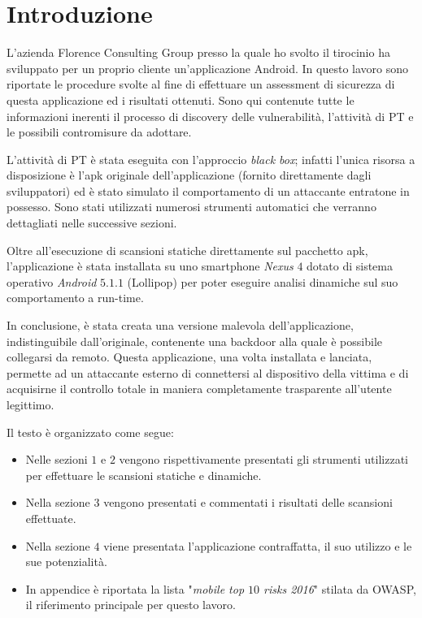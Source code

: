 \chapter*{Introduzione}
L'azienda Florence Consulting Group presso la quale ho svolto il tirocinio ha sviluppato per un proprio cliente un'applicazione Android. In questo lavoro sono riportate le procedure svolte al fine di effettuare un assessment di sicurezza di questa applicazione ed i risultati ottenuti. Sono qui contenute tutte le informazioni inerenti il processo di discovery delle vulnerabilità, l'attività di \ac{PT} e le possibili contromisure da adottare.  

L'attività di PT è stata eseguita con l'approccio \emph{black box}; infatti l'unica risorsa a disposizione è l'apk originale dell'applicazione (fornito direttamente dagli sviluppatori) ed è stato simulato il comportamento di un attaccante entratone in possesso. Sono stati utilizzati numerosi strumenti automatici che verranno dettagliati nelle successive sezioni.

Oltre all'esecuzione di scansioni statiche direttamente sul pacchetto apk, l'applicazione è stata installata su uno smartphone \emph{Nexus} $4$ dotato di sistema operativo \emph{Android} $5.1.1$ (Lollipop) per poter eseguire analisi dinamiche sul suo comportamento a run-time.

In conclusione, è stata creata una versione malevola dell'applicazione, indistinguibile dall'originale, contenente una backdoor alla quale è possibile collegarsi da remoto. Questa applicazione, una volta installata e lanciata, permette ad un attaccante esterno di connettersi al dispositivo della vittima e di acquisirne il controllo totale in maniera completamente trasparente all'utente legittimo.

Il testo è organizzato come segue:

\begin{itemize}
	\item Nelle sezioni $1$ e $2$ vengono rispettivamente presentati gli strumenti utilizzati per effettuare le scansioni statiche e dinamiche.
	\item Nella sezione $3$ vengono presentati e commentati i risultati delle scansioni effettuate.
	\item Nella sezione $4$ viene presentata l'applicazione contraffatta, il suo utilizzo e le sue potenzialità.
	\item In appendice è riportata la lista "\emph{mobile top $10$ risks 2016}" stilata da \ac{OWASP}, il riferimento principale per questo lavoro.
\end{itemize}